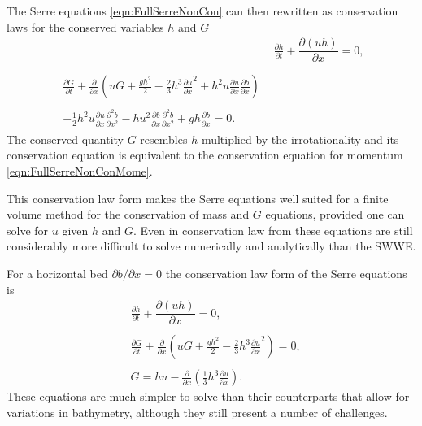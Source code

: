 The Serre equations \eqref{eqn:FullSerreNonCon} can then rewritten as conservation laws for the conserved variables $h$ and $G$
\begin{subequations}
	\label{eqn:FullSerreCon}
	\begin{align}
	& \frac{\partial h}{\partial t} + \dfrac{\partial (uh)}{\partial x} = 0 ,\label{eqn:FullSerreConMass}  \\ \nonumber \\
	\begin{split}
	\label{eqn:Serreconsconmom}
		\frac{\partial G}{\partial t}  + \frac{\partial}{\partial x} \left( {u} G + \frac{gh^2}{2} - \frac{2}{3}h^3 \frac{\partial {u}}{\partial x}^2 + h^2 {u}\frac{\partial {u}}{\partial x}\frac{\partial b}{\partial x} \right) \\ \\ + \frac{1}{2}h^2 {u} \frac{\partial {u}}{\partial x} \frac{\partial^2 b}{\partial x^2}  - h {u}^2\frac{\partial b}{\partial x}\frac{\partial^2 b}{\partial x^2} + gh\frac{\partial b}{\partial x} = 0.
	\end{split}
	\end{align}
\end{subequations}
The conserved quantity $G$ resembles $h$ multiplied by the irrotationality \cite{Choi-Camassa-1999-1,Carter-Cienfuegos-2011-259} and its conservation equation is equivalent to the conservation equation for momentum \eqref{eqn:FullSerreNonConMome}.

This conservation law form makes the Serre equations well suited for a finite volume method for the conservation of mass and $G$ equations, provided one can solve for $u$ given $h$ and $G$. Even in conservation law from these equations are still considerably more difficult to solve numerically and analytically than the SWWE.

For a horizontal bed $\partial b / \partial x = 0$ the conservation law form of the Serre equations is
\begin{subequations}
	\label{eqn:FullSerreConHorizBed}
	\begin{align}
	&\frac{\partial h}{\partial t} + \dfrac{\partial (uh)}{\partial x} = 0, \label{eqn:FullSerreConMassHorizBed} \\  \nonumber \\
	&\frac{\partial G}{\partial t}   + \frac{\partial}{\partial x} \left( {u} G + \frac{gh^2}{2} - \frac{2}{3}h^3 \frac{\partial {u}}{\partial x}^2 \right) = 0 , \label{eqn:SerreconsconmomHorizBed}\\ \nonumber \\
	&G =  h {u}  - \frac{\partial}{\partial x}\left(\frac{1}{3}h^3  \frac{\partial {u}}{\partial x}\right). \label{defn:SerreEqnConservedQuantity1HorizBed}
	\end{align}
\end{subequations}
These equations are much simpler to solve than their counterparts that allow for variations in bathymetry, although they still present a number of challenges.

